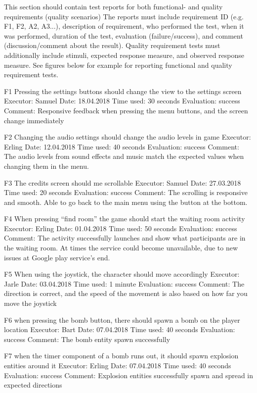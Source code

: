 
This section should contain test reports for both functional- and quality requirements (quality scenarios)
The reports must include requirement ID (e.g. F1, F2, A2, A3...), description of requirement, who performed the test, when it was performed, duration of the test, evaluation (failure/success), and comment (discussion/comment about the result).
Quality requirement tests must additionally include stimuli, expected response measure, and observed response measure.
See figures below for example for reporting functional and quality
requirement tests.






F1 Pressing the settings buttons should change the view to the settings screen
Executor: Samuel
Date: 18.04.2018
Time used: 30 seconds
Evaluation: success
Comment: Responsive feedback when pressing the menu buttons, and the screen change immediately

F2 Changing the audio settings should change the audio levels in game
Executor: Erling
Date: 12.04.2018
Time used: 40 seconds
Evaluation: success
Comment: The audio levels from sound effects and music match the expected values when changing them in the menu.

F3 The credits screen should me scrollable
Executor: Samuel
Date: 27.03.2018
Time used: 20 seconds
Evaluation: success
Comment: The scrolling is responsive and smooth. Able to go back to the main menu using the button at the bottom.

F4 When pressing “find room” the game should start the waiting room activity
Executor: Erling
Date: 01.04.2018
Time used: 50 seconds
Evaluation: success
Comment: The activity successfully launches and show what participants are in the waiting room. At times the service could become unavailable, due to new issues at Google play service’s end.

F5 When using the joystick, the character should move accordingly
Executor: Jarle
Date: 03.04.2018
Time used: 1 minute
Evaluation: success
Comment: The direction is correct, and the speed of the movement is also based on how far you move the joystick

F6 when pressing the bomb button, there should spawn a bomb on the player location
Executor: Bart
Date: 07.04.2018
Time used: 40 seconds
Evaluation: success
Comment: The bomb entity spawn successfully

F7 when the timer component of a bomb runs out, it should spawn explosion entities around it
Executor: Erling
Date: 07.04.2018
Time used: 40 seconds
Evaluation: success
Comment: Explosion entities successfully spawn and spread in expected directions

